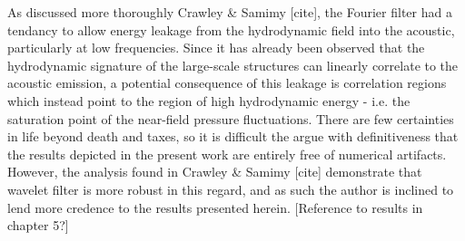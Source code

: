 As discussed more thoroughly Crawley \& Samimy [cite], the Fourier filter had a tendancy to allow energy leakage from the hydrodynamic field into the acoustic, particularly at low frequencies. 
Since it has already been observed that the hydrodynamic signature of the large-scale structures can linearly correlate to the acoustic emission, a potential consequence of this leakage is correlation regions which instead point to the region of high hydrodynamic energy - i.e. the saturation point of the near-field pressure fluctuations.
There are few certainties in life beyond death and taxes, so it is difficult the argue with definitiveness that the results depicted in the present work are entirely free of numerical artifacts.
However, the analysis found in Crawley \& Samimy [cite] demonstrate that wavelet filter is more robust in this regard, and as such the author is inclined to lend more credence to the results presented herein. [Reference to results in chapter 5?]
%
%
%
%
